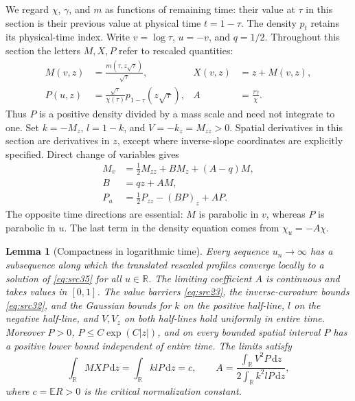 \documentclass[11pt,a4paper]{article}
\numberwithin{equation}{section}
\newtheorem{lemma}[theorem]{Lemma}
\theoremstyle{definition}
\theoremstyle{remark}
\newcommand{\E}{\mathbb E}
\newcommand{\R}{\mathbb R}
\newcommand{\dd}{\mathrm d}
\begin{document}
We regard $\chi$, $\gamma$, and $m$ as functions of remaining time:
their value at $\tau$ in this section is their previous value at
physical time $t=1-\tau$.  The density $p_t$ retains its physical-time
index.  Write $v=\log\tau$, $u=-v$, and $q=1/2$.  Throughout this section the
letters $M,X,P$ refer to rescaled quantities:
\[
 \begin{aligned}
 M(v,z)&=\frac{m(\tau,z\sqrt\tau)}{\sqrt\tau},&
 X(v,z)&=z+M(v,z),\\
 P(u,z)&=\frac{\sqrt\tau}{\chi(\tau)}p_{1-\tau}(z\sqrt\tau),&
 A&=\frac{\tau\gamma}{\chi}.
 \end{aligned}
\]
Thus $P$ is a positive density divided by a mass scale and need not
integrate to one.  Set $k=-M_z$, $l=1-k$, and $V=-k_z=M_{zz}>0$.
Spatial derivatives in this section are derivatives in $z$, except
where inverse-slope coordinates are explicitly specified.  Direct
change of variables gives
\begin{equation}
 \begin{split}
 M_v&=\tfrac12M_{zz}+BM_z+(A-q)M,\\
 B&=qz+AM,\\
 P_u&=\tfrac12P_{zz}-(BP)_z+AP.
 \end{split}
 \label{eq:src35}
\end{equation}
The opposite time directions are essential: $M$ is parabolic in $v$,
whereas $P$ is parabolic in $u$.  The last term in the density equation
comes from $\chi_u=-A\chi$.

\begin{lemma}[Compactness in logarithmic time]
\label{lem:contr-entire}
Every sequence $u_n\to\infty$ has a subsequence along which the
translated rescaled profiles converge locally to a solution of
\eqref{eq:src35} for all $u\in\R$.  The limiting coefficient $A$ is
continuous and takes values in $[0,1]$.  The value barriers
\eqref{eq:src23}, the inverse-curvature bounds \eqref{eq:src32}, and the
Gaussian bounds for $k$ on the positive half-line, $l$ on the negative
half-line, and $V,V_z$ on both half-lines hold uniformly in entire time.
Moreover $P>0$, $P\le C\exp(C|z|)$, and on every bounded spatial
interval $P$ has a positive lower bound independent of entire time.
The limits satisfy
\begin{equation}
 \int_\R MXP\,\dd z=\int_\R klP\,\dd z=c,
 \qquad
 A=\frac{\displaystyle\int_\R V^2P\,\dd z}
          {\displaystyle2\int_\R k^2lP\,\dd z},
 \label{eq:src36}
\end{equation}
where $c=\E R>0$ is the critical normalization constant.
\end{lemma}
\end{document}
